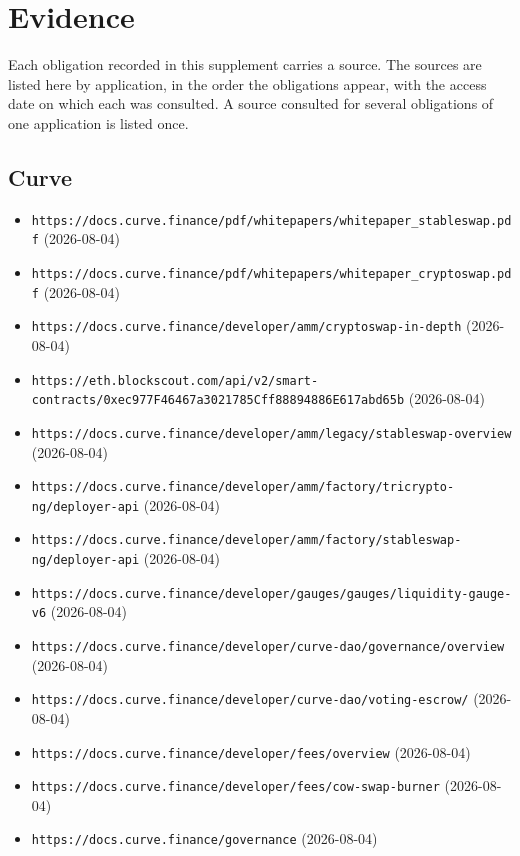 \section{Evidence}\label{sec:evidence}

Each obligation recorded in this supplement carries a source. The sources are
listed here by application, in the order the obligations appear, with the
access date on which each was consulted. A source consulted for several
obligations of one application is listed once.

\subsection*{Curve}
\begin{itemize}\setlength{\itemsep}{0pt}\small
\item \texttt{https://docs.curve.finance/pdf/whitepapers/whitepaper\_stableswap.pdf} (2026-08-04)
\item \texttt{https://docs.curve.finance/pdf/whitepapers/whitepaper\_cryptoswap.pdf} (2026-08-04)
\item \texttt{https://docs.curve.finance/developer/amm/cryptoswap-in-depth} (2026-08-04)
\item \texttt{https://eth.blockscout.com/api/v2/smart-contracts/0xec977F46467a3021785Cff88894886E617abd65b} (2026-08-04)
\item \texttt{https://docs.curve.finance/developer/amm/legacy/stableswap-overview} (2026-08-04)
\item \texttt{https://docs.curve.finance/developer/amm/factory/tricrypto-ng/deployer-api} (2026-08-04)
\item \texttt{https://docs.curve.finance/developer/amm/factory/stableswap-ng/deployer-api} (2026-08-04)
\item \texttt{https://docs.curve.finance/developer/gauges/gauges/liquidity-gauge-v6} (2026-08-04)
\item \texttt{https://docs.curve.finance/developer/curve-dao/governance/overview} (2026-08-04)
\item \texttt{https://docs.curve.finance/developer/curve-dao/voting-escrow/} (2026-08-04)
\item \texttt{https://docs.curve.finance/developer/fees/overview} (2026-08-04)
\item \texttt{https://docs.curve.finance/developer/fees/cow-swap-burner} (2026-08-04)
\item \texttt{https://docs.curve.finance/governance} (2026-08-04)
\end{itemize}

